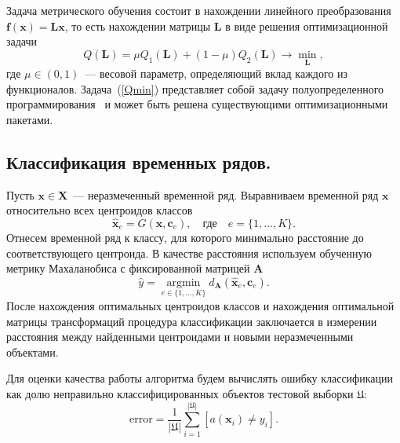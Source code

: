 Задача метрического обучения состоит в нахождении линейного преобразования $\mathbf{f}(\mathbf{x}) = \mathbf{Lx}$, то есть нахождении матрицы $\mathbf{L}$ в виде решения оптимизационной задачи
\begin{equation}
\label{Qmin}
Q(\mathbf{L}) = \mu Q_1(\mathbf{L}) + (1 - \mu) Q_2(\mathbf{L}) \rightarrow \min_{\mathbf{L}},
\end{equation}
где $\mu \in (0, 1)$~--- весовой параметр, определяющий вклад каждого из функционалов.
Задача~(\ref{Qmin}) представляет собой задачу полуопределенного программирования~\cite{vandenberghe1996semidefinite} и может быть решена существующими оптимизационными пакетами.

\subsection{Классификация временных рядов.}

Пусть $\mathbf{x} \in \mathbf{X}$~--- неразмеченный временной ряд. Выравниваем временной ряд $\mathbf{x}$ относительно всех центроидов классов
\[
\mathbf{\hat{x}}_e = G(\mathbf{x}, \mathbf{c}_e), \quad \text{где} \quad e = \{1, \dots, K\}.
\]
Отнесем временной ряд к классу, для которого минимально расстояние до соответствующего центроида. В качестве расстояния используем обученную метрику Махаланобиса с фиксированной матрицей $\mathbf{A}$
\[
\hat{y} = \mathop{\text{argmin}}\limits_{e \in \{1, \dots, K\}}d_\mathbf{A}(\mathbf{\hat{x}}_e, \mathbf{c}_e).
\]
После нахождения оптимальных центроидов классов и нахождения оптимальной матрицы трансформаций процедура классификации заключается в измерении расстояния между найденными центроидами и новыми неразмеченными объектами.

Для оценки качества работы алгоритма будем вычислять ошибку классификации как долю неправильно классифицированных объектов тестовой выборки $\mathfrak{U}$:
\[
\text{error} = \frac1{|\mathfrak{U}|} \sum_{i = 1} ^ {|\mathfrak{U}|} [a(\mathbf{x}_i) \ne y_i].
\]

